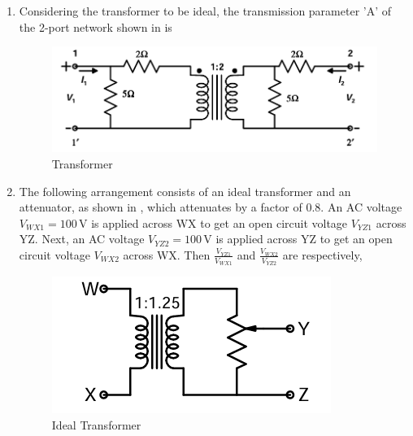 \documentclass[journal,12pt,onecolumn]{IEEEtran}
\theoremstyle{remark}
\begin{document}
\begin{enumerate}
\item Considering the transformer to be ideal, the transmission parameter 'A' of the 2-port network shown in  is  
\par \hfill{}
\begin{figure}[H]
\centering
\includegraphics[width=0.5\columnwidth]{Figs/Q-29.png}
\caption{Transformer}
\label{29}
\end{figure}
\begin{enumerate}
\end{enumerate}

\item The following arrangement consists of an ideal transformer and an attenuator, as shown in , which attenuates by a factor of $0.8$. An AC voltage $V_{WX 1} = 100\,\text{V}$ is applied across WX to get an open circuit voltage $V_{YZ1}$ across YZ. Next, an AC voltage $V_{YZ2} = 100\,\text{V}$ is applied across YZ to get an open circuit voltage $V_{WX 2}$ across WX. Then $\frac{V_{YZ1}}{V_{WX1}}$ and $\frac{V_{WX2}}{V_{YZ2}}$ are respectively,  
\par \hfill{}
\begin{figure}[H]
\centering
    \includegraphics[width=0.5\linewidth]{Figs/Q-30.png}
    \caption{Ideal Transformer}
    \label{30}
\end{figure}
\begin{enumerate}
\end{enumerate}


\end{enumerate}
\end{document}
